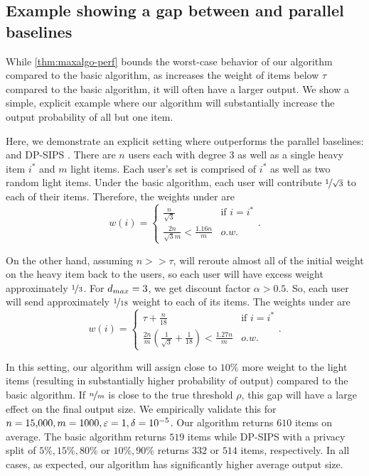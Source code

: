 \subsection{Example showing a gap between \ouralgo{} and parallel baselines}
While \cref{thm:maxalgo-perf} bounds the worst-case behavior of our algorithm compared to the basic algorithm, as \ouralgo{} increases the weight of items below $\tau$ compared to the basic algorithm, it will often have a larger output. We show a simple, explicit example where our algorithm will substantially increase the output probability of all but one item.

Here, we demonstrate an explicit setting where \ouralgo{} outperforms the parallel baselines: \basicalgo{} \cite{korolova2009releasing, gopi2020dpunion} and DP-SIPS \cite{swanberg2023dpsips}.
There are $n$ users each with degree $3$ as well as a single heavy item $i^*$ and $m$ light items. Each user's set is comprised of $i^*$ as well as two random light items. Under the basic algorithm, each user will contribute $\nicefrac{1}{\sqrt{3}}$ to each of their items. Therefore, the weights under \basicalgo{} are
\begin{equation*}
    w(i) = 
    \begin{cases}
        \frac{n}{\sqrt{3}} & \text{if } i = i^* \\
        \frac{2n}{\sqrt{3}m} < \frac{1.16n}{m} & o.w.
    \end{cases}.
\end{equation*}

On the other hand, assuming $n >> \tau$, \ouralgo{} will reroute almost all of the initial weight on the heavy item back to the users, so each user will have excess weight approximately $\nicefrac{1}{3}$. For $d_{max}=3$, we get discount factor $\alpha > 0.5$. So, each user will send approximately $\nicefrac{1}{18}$ weight to each of its items. The weights under \ouralgo{} are
\begin{equation*}
    w(i) = 
    \begin{cases}
        \tau + \frac{n}{18} & \text{if } i = i^* \\
        \frac{2n}{m}\left(\frac{1}{\sqrt{3}} + \frac{1}{18}\right) < \frac{1.27n}{m} & o.w.
    \end{cases}.
\end{equation*}

In this setting, our algorithm will assign close to $10\%$ more weight to the light items  (resulting in substantially higher probability of output) compared to the basic algorithm.
If $\nicefrac{n}{m}$ is close to the true threshold $\rho$, this gap will have a large effect on the final output size. We empirically validate this for $n=\num{15000}, m=1000, \varepsilon=1, \delta=10^{-5}$. Our algorithm returns $610$ items on average. The basic algorithm returns $519$ items while DP-SIPS with a privacy split of $5\%, 15\%, 80\%$ or $10\%, 90\%$ returns $332$ or $514$ items, respectively. In all cases, as expected, our algorithm has significantly higher average output size. 